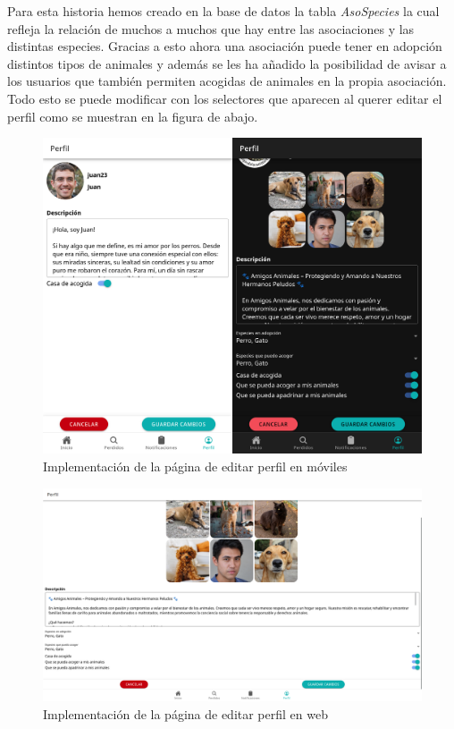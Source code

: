 Para esta historia hemos creado en la base de datos la tabla \textit{AsoSpecies} la cual refleja la relación de muchos a muchos que hay entre las asociaciones y las distintas especies. Gracias a esto ahora una asociación puede tener en adopción distintos tipos de animales y además se les ha añadido la posibilidad de avisar a los usuarios que también permiten acogidas de animales en la propia  asociación. Todo esto se puede modificar con los selectores que aparecen al querer editar el perfil como se muestran en la figura de abajo.


\begin{figure}[H]
	\centering
	\includegraphics[width=1\linewidth]{"sprint 4/hu17/implementacion"}
	\caption{Implementación de la página de editar perfil en móviles}
	\label{fig:implementacionEditarPerfil}
\end{figure}


\begin{figure}[H]
	\centering
	\includegraphics[width=1\linewidth]{"sprint 4/hu17/implementacionWeb"}
	\caption{Implementación de la página de editar perfil en web}
	\label{fig:implementacionEditarPerfilWeb}
\end{figure}


